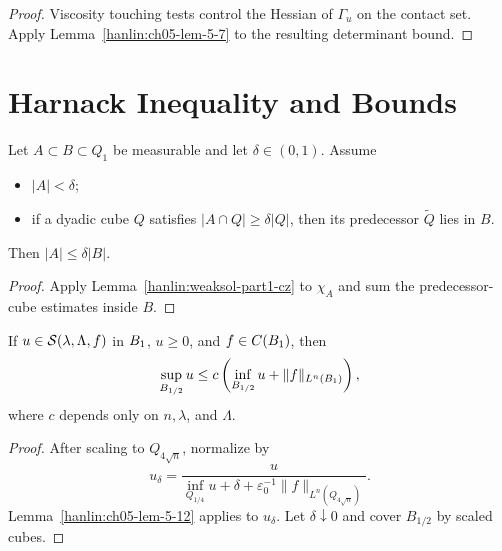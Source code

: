 \begin{proof}
\sketch Viscosity touching tests control the Hessian of $\Gamma_u$ on the
contact set. Apply Lemma~\ref{hanlin:ch05-lem-5-7} to the resulting
determinant bound.
\end{proof}

\section{Harnack Inequality and \Calpha Bounds}

\begin{lemma}\label{hanlin:ch05-lem-5-9}
Let $A\subset B\subset Q_1$ be measurable and let $\delta\in(0,1)$.
Assume
\begin{itemize}
\item[(i)] $|A|<\delta$;
\item[(ii)] if a dyadic cube $Q$ satisfies $|A\cap Q|\geq\delta|Q|$,
then its predecessor $\widetilde Q$ lies in $B$.
\end{itemize}
Then $|A|\leq\delta|B|$.
\end{lemma}

\begin{proof}
\sketch Apply Lemma~\ref{hanlin:weaksol-part1-cz} to $\chi_A$ and sum
the predecessor-cube estimates inside $B$.
\end{proof}



\begin{theorem}\label{hanlin:ch05-thm-5-10}
If $u\in\mathcal{S}(\lambda,\Lambda,f)$ in $B_1$, $u\geq0$, and
$f\in C(B_1)$, then
\[
\sup_{B_{1/2}}u
\leq c\left(\inf_{B_{1/2}}u+\|f\|_{L^n(B_1)}\right),
\]
where $c$ depends only on $n,\lambda$, and $\Lambda$.
\end{theorem}
\begin{proof}
\sketch After scaling to $Q_{4\sqrt n}$, normalize by
\[
u_\delta=
\frac{u}{\inf_{Q_{1/4}}u+\delta+
\varepsilon_0^{-1}\|f\|_{L^n(Q_{4\sqrt n})}}.
\]
Lemma~\ref{hanlin:ch05-lem-5-12} applies to $u_\delta$. Let
$\delta\downarrow0$ and cover $B_{1/2}$ by scaled cubes.
\end{proof}

